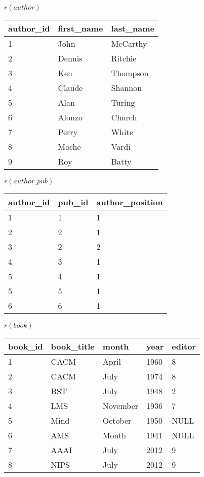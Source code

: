 \documentclass[answers,10pt,a4paper]{exam}
\begin{document}
\begin{figure}[H]
\begin{multicols}{2}
$r(author)$\\
\begin{tabular}{|l|l|l|}\hline
\rowcolor{lightgray} author\_id & first\_name & last\_name \\\hline
1 & John       & McCarthy  \\\hline
2 & Dennis     & Ritchie   \\\hline
3 & Ken        & Thompson  \\\hline
4 & Claude     & Shannon   \\\hline
5 & Alan       & Turing    \\\hline
6 & Alonzo     & Church    \\\hline
7 & Perry      & White     \\\hline
8 & Moshe      & Vardi     \\\hline
9 & Roy        & Batty     \\\hline
\end{tabular}

\columnbreak

$r(author\_pub)$\\
\begin{tabular}{|l|l|l|}\hline
\rowcolor{lightgray} author\_id & pub\_id & author\_position \\\hline
1 &      1 &      1 \\\hline
2 &      2 &      1 \\\hline
3 &      2 &      2 \\\hline
4 &      3 &      1 \\\hline
5 &      4 &      1 \\\hline
5 &      5 &      1 \\\hline
6 &      6 &      1 \\\hline
\end{tabular}
\end{multicols}

\begin{multicols}{2}

$r(book)$\\
\begin{tabular}{|l|l|l|l|l|}\hline
\rowcolor{lightgray} book\_id & book\_title & month    & year & editor \\\hline
       1 & CACM       & April    & 1960 &      8 \\\hline
       2 & CACM       & July     & 1974 &      8 \\\hline
       3 & BST        & July     & 1948 &      2 \\\hline
       4 & LMS        & November & 1936 &      7 \\\hline
       5 & Mind       & October  & 1950 &   NULL \\\hline
       6 & AMS        & Month    & 1941 &   NULL \\\hline
       7 & AAAI       & July     & 2012 &      9 \\\hline
       8 & NIPS       & July     & 2012 &      9 \\\hline
\end{tabular}


\end{multicols}
\end{figure}
\end{document}
